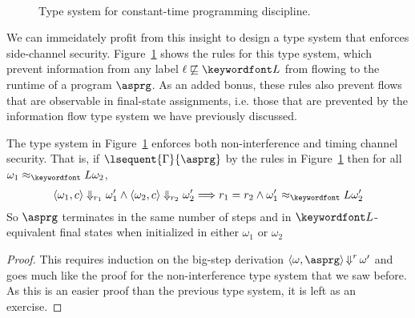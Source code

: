 \documentclass[11pt,twoside]{scrartcl}
\begin{document}
\begin{figure}
\begin{calculuscollections}{\textwidth}
\begin{calculus}
{{}{
  \lsequent{\Gamma}{\asprg;\bsprg}
}}{}%
\end{calculus}
\\[1em]
\begin{calculus}
{\linferenceRule[sequent] {
  \lsequent{\Gamma}{\ivr : \lowsec}
  &\lsequent{\Gamma}{\asprg}
  &\lsequent{\Gamma}{\bsprg}
}{
  \lsequent{\Gamma}{\pif{\ivr}{\asprg}{\bsprg}}
}}{}%
\end{calculus}
\hspace{\linferenceRulehskipamount}
\begin{calculus}
{\linferenceRule[sequent] {
  \lsequent{\Gamma}{\ivr : \lowsec}
  &\lsequent{\Gamma}{\asprg}
}{
  \lsequent{\Gamma}{\pwhile{\ivr}{\asprg}}
}}{}%
\end{calculus}
\end{calculuscollections}

\caption{Type system for constant-time programming discipline.}
\label{fig:const-types}
\end{figure}

We can immeidately profit from this insight to design a type system that enforces side-channel security. Figure~\ref{fig:const-types} shows the rules for this type system, which prevent information from any label $\ell \not\sqsubseteq \lowsec$ from flowing to the runtime of a program $\asprg$. As an added bonus, these rules also prevent flows that are observable in final-state assignments, i.e. those that are prevented by the information flow type system we have previously discussed.

\begin{theorem}
\label{thm:sidechan-types}
The type system in Figure~\ref{fig:const-types} enforces both non-interference and timing channel security. That is, if $\lsequent{\Gamma}{\asprg}$ by the rules in Figure~\ref{fig:const-types} then for all $\omega_1\approx_\lowt\omega_2$, 
\[
\langle \omega_1, c\rangle \Downarrow_{r_1} \omega_1' \land \langle\omega_2, c\rangle\Downarrow_{r_2}\omega_2' \Longrightarrow r_1 = r_2 \land \omega_1' \approx_\lowt \omega_2'
\]
So $\asprg$ terminates in the same number of steps and in $\lowsec$-equivalent final states when initialized in either $\omega_1$ or $\omega_2$
\end{theorem}
\begin{proof}
This requires induction on the big-step derivation $\langle\omega,\asprg\rangle \bigstep^r \omega'$ and goes much like the proof for the non-interference type system that we saw before. As this is an easier proof than the previous type system, it is left as an exercise.
\end{proof}
\end{document}
